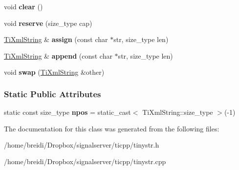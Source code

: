 \begin{DoxyCompactItemize}
\item 
\hypertarget{class_ti_xml_string_ab20e06e4c666abf3bdbfb3a1191d4888}{
void {\bfseries clear} ()}
\label{class_ti_xml_string_ab20e06e4c666abf3bdbfb3a1191d4888}

\item 
\hypertarget{class_ti_xml_string_a88ecf9f0f00cb5c67b6b637958d7049c}{
void {\bfseries reserve} (size\_\-type cap)}
\label{class_ti_xml_string_a88ecf9f0f00cb5c67b6b637958d7049c}

\item 
\hypertarget{class_ti_xml_string_ac72f3d9149b7812c1e6c59402014d0d5}{
\hyperlink{class_ti_xml_string}{TiXmlString} \& {\bfseries assign} (const char $\ast$str, size\_\-type len)}
\label{class_ti_xml_string_ac72f3d9149b7812c1e6c59402014d0d5}

\item 
\hypertarget{class_ti_xml_string_ad44b21700d2ec24a511367b222b643fb}{
\hyperlink{class_ti_xml_string}{TiXmlString} \& {\bfseries append} (const char $\ast$str, size\_\-type len)}
\label{class_ti_xml_string_ad44b21700d2ec24a511367b222b643fb}

\item 
\hypertarget{class_ti_xml_string_aa392cbc180752a79f007f4f9280c7762}{
void {\bfseries swap} (\hyperlink{class_ti_xml_string}{TiXmlString} \&other)}
\label{class_ti_xml_string_aa392cbc180752a79f007f4f9280c7762}

\end{DoxyCompactItemize}
\subsubsection*{Static Public Attributes}
\begin{DoxyCompactItemize}
\item 
\hypertarget{class_ti_xml_string_a8f4422d227088dc7bec96f479b275d0a}{
static const size\_\-type {\bfseries npos} = static\_\-cast$<$ TiXmlString::size\_\-type $>$(-\/1)}
\label{class_ti_xml_string_a8f4422d227088dc7bec96f479b275d0a}

\end{DoxyCompactItemize}


The documentation for this class was generated from the following files:\begin{DoxyCompactItemize}
\item 
/home/breidi/Dropbox/signalserver/ticpp/tinystr.h\item 
/home/breidi/Dropbox/signalserver/ticpp/tinystr.cpp\end{DoxyCompactItemize}
